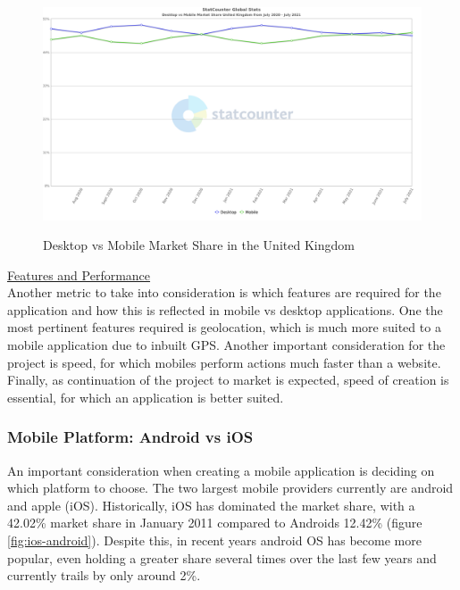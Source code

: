 \documentclass[12pt]{article}
\begin{document}
	\begin{figure}[H]
		\centering
		\includegraphics[scale=0.45]{images/GB-mobile-desktop.png}
		\caption{Desktop vs Mobile Market Share in the United Kingdom}
		\label{fig:uk-mobile-desktop}
		\cite{DesktopVsMobile2021a}
	\end{figure}

	\noindent
	\underline{Features and Performance}
	\\
	\noindent
	Another metric to take into consideration is which features are required for the application and how this is reflected in mobile vs desktop applications. One the most pertinent features required is geolocation, which is much more suited to a mobile application due to inbuilt GPS. Another important consideration for the project is speed, for which mobiles perform actions much faster than a website. Finally, as continuation of the project to market is expected, speed of creation is essential, for which an application is better suited.

	
	\subsubsection{Mobile Platform: Android vs iOS}
	An important consideration when creating a mobile application is deciding on which platform to choose. The two largest mobile providers currently are android and apple (iOS). Historically, iOS has dominated the market share, with a 42.02\% market share in January 2011 compared to Androids 12.42\% (figure \ref{fig:ios-android}). Despite this, in recent years android OS has become more popular, even holding a greater share several times over the last few years and currently trails by only around 2\%.
	
\end{document}

